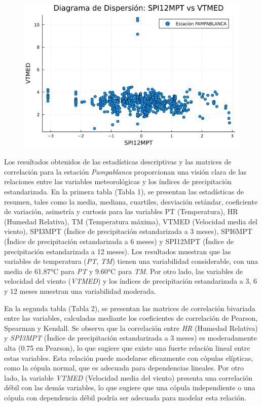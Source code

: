 \begin{figure}[htbp]
\begin{minipage}{0.32\textwidth}
    \includegraphics[width=\linewidth]{Capitulos/Scaterplot/PAMPABLANCA_SPI12MPT_vs_VTMED.png}
\end{minipage}

\end{figure}


Los resultados obtenidos de las estadísticas descriptivas y las matrices de correlación para la estación \textit{Pampablanca} proporcionan una visión clara de las relaciones entre las variables meteorológicas y los índices de precipitación estandarizada. En la primera tabla (Tabla 1), se presentan las estadísticas de resumen, tales como la media, mediana, cuartiles, desviación estándar, coeficiente de variación, asimetría y curtosis para las variables PT (Temperatura), HR (Humedad Relativa), TM (Temperatura máxima), VTMED (Velocidad media del viento), SPI3MPT (Índice de precipitación estandarizada a 3 meses), SPI6MPT (Índice de precipitación estandarizada a 6 meses) y SPI12MPT (Índice de precipitación estandarizada a 12 meses). Los resultados muestran que las variables de temperatura (\textit{PT}, \textit{TM}) tienen una variabilidad considerable, con una media de 61.87°C para \textit{PT} y 9.60°C para \textit{TM}. Por otro lado, las variables de velocidad del viento (\textit{VTMED}) y los índices de precipitación estandarizada a 3, 6 y 12 meses muestran una variabilidad moderada.

En la segunda tabla (Tabla 2), se presentan las matrices de correlación bivariada entre las variables, calculadas mediante los coeficientes de correlación de Pearson, Spearman y Kendall. Se observa que la correlación entre \textit{HR} (Humedad Relativa) y \textit{SPI3MPT} (Índice de precipitación estandarizada a 3 meses) es moderadamente alta (0.75 en Pearson), lo que sugiere que existe una fuerte relación lineal entre estas variables. Esta relación puede modelarse eficazmente con cópulas elípticas, como la cópula normal, que es adecuada para dependencias lineales. Por otro lado, la variable \textit{VTMED} (Velocidad media del viento) presenta una correlación débil con las demás variables, lo que sugiere que una cópula independiente o una cópula con dependencia débil podría ser adecuada para modelar esta relación.

